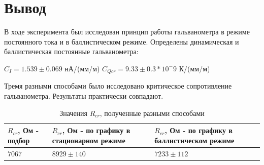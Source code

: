 \documentclass[a4paper]{article}
\begin{document}
\section{Вывод}

В ходе эксперимента был исследован принцип работы гальванометра в режиме постоянного тока и в баллистическом режиме. Определены динамическая и баллистическая постоянные гальванометра:

\begin{center}
    $C_I = 1.539 \pm 0.069$ нА/(мм/м) \hspace{1cm} $C_{Qcr}= 9.33 \pm 0.3 * 10^-9$ К/(мм/м)
\end{center}

Тремя разными способами было исследовано критическое сопротивление гальванометра. Результаты практически совпадают.

\begin{table}[h]
    \centering
    \begin{center}
        \caption{Значения $R_{cr}$, полученные разными способами}
    \end{center}
    \vspace{0.1cm}
    \label{tab:my_label}
    \begin{tabular}{ |p{4cm}|p{4cm}|p{4cm}|}
        \hline
        $R_{cr}$, Ом - подбор & $R_{cr}$, Ом  - по графику в стационарном режиме & $R_{cr}$, Ом - по графику в баллистическом режиме \\
        \hline
        $7067$                & $8929 \pm 140$                                    & $7233 \pm 112$                                      \\
        \hline
    \end{tabular}
\end{table}
\end{document}
